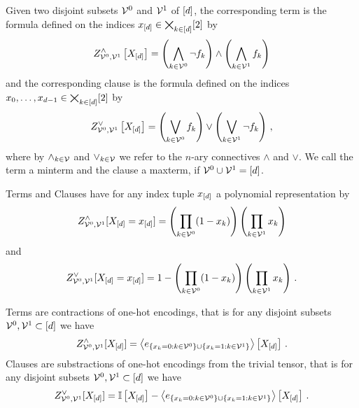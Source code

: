 %


\begin{definition}\label{def:clauses}
	Given two disjoint subsets $\mathcal{V}^{0}$ and $\mathcal{V}^{1}$ of $[d]$, the corresponding term is the formula defined on the indices $x_{[d]}\in\bigtimes_{k\in[d]}[2]$ by
		\[ Z^{\land}_{\mathcal{V}^{0},\mathcal{V}^{1}}\left[X_{[d]}\right]
		=\left( \bigwedge_{k\in\mathcal{V}^{0}} \lnot f_{k} \right)  \land \left( \bigwedge_{k\in\mathcal{V}^{1}} f_{k} \right)  \]
	and the corresponding clause is the formula defined on the indices $x_{0},\ldots,x_{d-1}\in\bigtimes_{k\in[d]}[2]$ by
		\[ Z^{\lor}_{\mathcal{V}^{0},\mathcal{V}^{1}}\left[X_{[d]}\right]
		=\left( \bigvee_{k\in\mathcal{V}^{0}} f_{k} \right)  \lor \left( \bigvee_{k\in\mathcal{V}^{1}} \lnot f_{k} \right)  \, , \]
	where by $\land_{k\in\mathcal{V}}$ and $\lor_{k\in\mathcal{V}}$ we refer to the $n$-ary connectives $\land$ and $\lor$.
	We call the term a minterm and the clause a maxterm, if $\mathcal{V}^{0}\cup\mathcal{V}^{1} = [d]$.
\end{definition}

Terms and Clauses have for any index tuple $x_{[d]}$ a polynomial representation by
		\[ Z^{\land}_{\mathcal{V}^{0},\mathcal{V}^{1}}[X_{[d]}=x_{[d]}] 
		= \left( \prod_{k \in \mathcal{V}^{0}} (1-x_{k}) \right)
		\left(  \prod_{k \in \mathcal{V}^{1}} x_{k} \right) \]
and
		\[ Z^{\lor}_{\mathcal{V}^{0},\mathcal{V}^{1}}[X_{[d]}=x_{[d]}] 
		= 1 - \left( \prod_{k \in \mathcal{V}^{0}} (1-x_{k})\right)
		\left(  \prod_{k \in \mathcal{V}^{1}} x_{k} \right) \, . \]


\begin{lemma}\label{lem:termClauseOneHot}
	Terms are contractions of one-hot encodings, that is for any disjoint subsets $\mathcal{V}^{0},\mathcal{V}^{1}\subset[d]$ we have
		\[ Z^{\land}_{\mathcal{V}^{0},\mathcal{V}^{1}}[X_{[d]}] = \left\langle e_{\{x_{k}=0 : k\in\mathcal{V}^{0} \} \cup \{x_{k}=1 : k\in\mathcal{V}^{1}\}}\right\rangle \left[ X_{[d]} \right] \, . \]
	Clauses are substractions of one-hot encodings from the trivial tensor, that is for any disjoint subsets $\mathcal{V}^{0},\mathcal{V}^{1}\subset[d]$ we have
		\[ Z^{\lor}_{\mathcal{V}^{0},\mathcal{V}^{1}}[X_{[d]}] = 
		\mathbb{I}\left[X_{[d]}\right] -
		\left\langle e_{\{x_{k}=0 : k\in\mathcal{V}^{0} \} \cup \{x_{k}=1 : k\in\mathcal{V}^{1}\}}\right\rangle \left[ X_{[d]} \right] \, . \]
\end{lemma}


